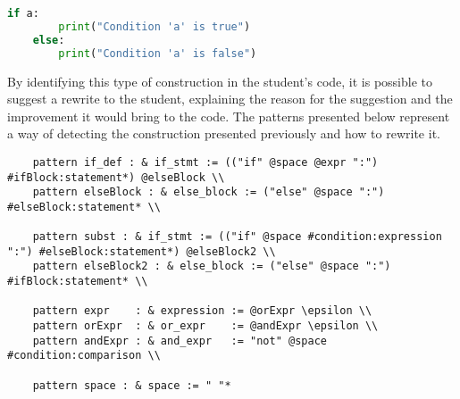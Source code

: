 \begin{lstlisting}[language=Python]
    if a:
        print("Condition 'a' is true")
    else:
        print("Condition 'a' is false")
\end{lstlisting}

By identifying this type of construction in the student's code, it is possible 
to suggest a rewrite to the student, explaining the reason for the suggestion 
and the improvement it would bring to the code. The patterns presented below 
represent a way of detecting the construction presented previously and how to 
rewrite it.

    
    
    
\begin{verbatim}
    pattern if_def : & if_stmt := (("if" @space @expr ":") #ifBlock:statement*) @elseBlock \\
    pattern elseBlock : & else_block := ("else" @space ":") #elseBlock:statement* \\

    pattern subst : & if_stmt := (("if" @space #condition:expression ":") #elseBlock:statement*) @elseBlock2 \\
    pattern elseBlock2 : & else_block := ("else" @space ":") #ifBlock:statement* \\

    pattern expr    : & expression := @orExpr \epsilon \\
    pattern orExpr  : & or_expr    := @andExpr \epsilon \\
    pattern andExpr : & and_expr   := "not" @space #condition:comparison \\

    pattern space : & space := " "*
\end{verbatim}

